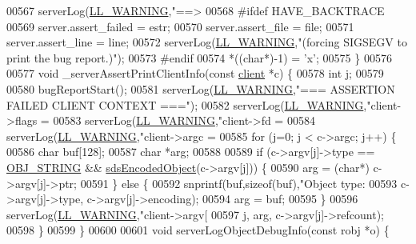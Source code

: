 \begin{DoxyCode}
{{{{{{{{{{{{{{{{{{{{{{{{{00567     serverLog(\hyperlink{server_8h_a31229b9334bba7d6be2a72970967a14b}{LL\_WARNING},\textcolor{stringliteral}{"==> %
00568 \textcolor{preprocessor}{#}\textcolor{preprocessor}{ifdef} HAVE\_BACKTRACE
00569     server.assert\_failed = estr;
00570     server.assert\_file = file;
00571     server.assert\_line = line;
00572     serverLog(\hyperlink{server_8h_a31229b9334bba7d6be2a72970967a14b}{LL\_WARNING},\textcolor{stringliteral}{"(forcing SIGSEGV to print the bug report.)"});
00573 \textcolor{preprocessor}{#}\textcolor{preprocessor}{endif}
00574     *((\textcolor{keywordtype}{char}*)-1) = \textcolor{stringliteral}{'x'};
00575 \}
00576 
00577 \textcolor{keywordtype}{void} \_serverAssertPrintClientInfo(\textcolor{keyword}{const} \hyperlink{structclient}{client} *c) \{
00578     \textcolor{keywordtype}{int} j;
00579 
00580     bugReportStart();
00581     serverLog(\hyperlink{server_8h_a31229b9334bba7d6be2a72970967a14b}{LL\_WARNING},\textcolor{stringliteral}{"=== ASSERTION FAILED CLIENT CONTEXT ==="});
00582     serverLog(\hyperlink{server_8h_a31229b9334bba7d6be2a72970967a14b}{LL\_WARNING},\textcolor{stringliteral}{"client->flags = %
00583     serverLog(\hyperlink{server_8h_a31229b9334bba7d6be2a72970967a14b}{LL\_WARNING},\textcolor{stringliteral}{"client->fd = %
00584     serverLog(\hyperlink{server_8h_a31229b9334bba7d6be2a72970967a14b}{LL\_WARNING},\textcolor{stringliteral}{"client->argc = %
00585     \textcolor{keywordflow}{for} (j=0; j < c->argc; j++) \{
00586         \textcolor{keywordtype}{char} buf[128];
00587         \textcolor{keywordtype}{char} *arg;
00588 
00589         \textcolor{keywordflow}{if} (c->argv[j]->type == \hyperlink{server_8h_a65236ea160f69cdef33ec942092af88f}{OBJ\_STRING} && \hyperlink{server_8h_afcfb5bd97af52d1dbce331745cae030c}{sdsEncodedObject}(c->argv[j])) 
      \{
00590             arg = (\textcolor{keywordtype}{char}*) c->argv[j]->ptr;
00591         \} \textcolor{keywordflow}{else} \{
00592             snprintf(buf,\textcolor{keyword}{sizeof}(buf),\textcolor{stringliteral}{"Object type: %
00593                 c->argv[j]->type, c->argv[j]->encoding);
00594             arg = buf;
00595         \}
00596         serverLog(\hyperlink{server_8h_a31229b9334bba7d6be2a72970967a14b}{LL\_WARNING},\textcolor{stringliteral}{"client->argv[%
00597             j, arg, c->argv[j]->refcount);
00598     \}
00599 \}
00600 
00601 \textcolor{keywordtype}{void} serverLogObjectDebugInfo(\textcolor{keyword}{const} robj *o) \{
}}}}}}}}}}}}}}}}}}}}}}}}}}}}}}}
\end{DoxyCode}
